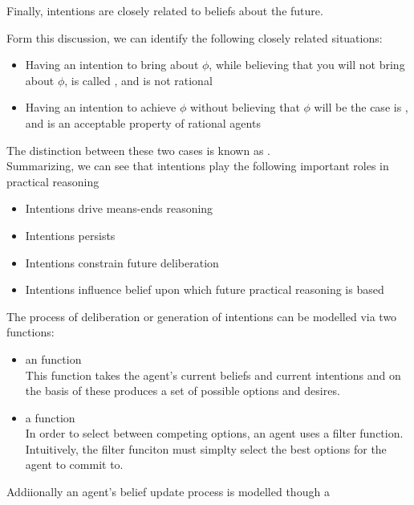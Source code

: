 Finally, intentions are closely related to beliefs about the future.

Form this discussion, we can identify the following closely related situations:
\begin{itemize}
\item Having an intention to bring about $\phi$, while believing that you will not bring about $\phi$, is called , and is not rational
\item Having an intention to achieve $\phi$ without believing that $\phi$ will be the case is , and is an acceptable property of rational agents
\end{itemize}

The distinction between these two cases is known as .\\
Summarizing, we can see that intentions play the following important roles in practical reasoning
\begin{itemize}
\item Intentions drive means-ends reasoning
\item Intentions persists
\item Intentions constrain future deliberation
\item Intentions influence belief upon which future practical reasoning is based
\end{itemize}

The process of deliberation or generation of intentions can be modelled via two functions:
\begin{itemize}
\item an  function\\
This function takes the agent's current beliefs and current intentions and on the basis of these produces a set of possible options and desires.
\item a  function\\
In order to select between competing options, an agent uses a filter function. Intuitively, the filter funciton must simplty select the best options for the agent to commit to.
\end{itemize}
Addiionally an agent's belief update process is modelled though a 

